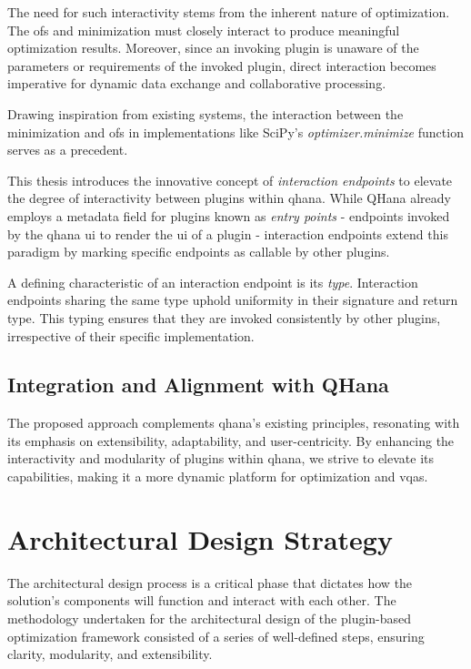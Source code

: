 \documentclass[
  a4paper,  %
  twoside,  %
  bibliography=totoc,
  headsepline,
  cleardoublepage=empty,
  parskip=half,
  draft=false
]{scrbook}
\begin{document}
The need for such interactivity stems from the inherent nature of optimization.
The \glspl{of} and minimization must closely interact to produce meaningful optimization results.
Moreover, since an invoking plugin is unaware of the parameters or requirements of the invoked plugin, direct interaction becomes imperative for dynamic data exchange and collaborative processing.

Drawing inspiration from existing systems, the interaction between the minimization and \glspl{of} in implementations like SciPy's \emph{optimizer.minimize} \cite{Virtanen2020} function serves as a precedent.

This thesis introduces the innovative concept of \emph{interaction endpoints} to elevate the degree of interactivity between plugins within \gls{qhana}.
While QHana already employs a metadata field for plugins known as \emph{entry points} - endpoints invoked by the \gls{qhana} \gls{ui} to render the \gls{ui} of a plugin - interaction endpoints extend this paradigm by marking specific endpoints as callable by other plugins.

A defining characteristic of an interaction endpoint is its \emph{type}.
Interaction endpoints sharing the same type uphold uniformity in their signature and return type.
This typing ensures that they are invoked consistently by other plugins, irrespective of their specific implementation.

\subsection{Integration and Alignment with QHana}
The proposed approach complements \gls{qhana}'s existing principles, resonating with its emphasis on extensibility, adaptability, and user-centricity.
By enhancing the interactivity and modularity of plugins within \gls{qhana}, we strive to elevate its capabilities, making it a more dynamic platform for optimization and \glspl{vqa}.

\section{Architectural Design Strategy}
\label{sec:architecturalDesignStrategy}

The architectural design process is a critical phase that dictates how the solution's components will function and interact with each other.
The methodology undertaken for the architectural design of the plugin-based optimization framework consisted of a series of well-defined steps, ensuring clarity, modularity, and extensibility.
\end{document}
